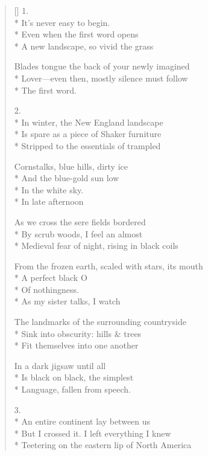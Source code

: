 \label{ch:landscapes}
\settowidth{\versewidth}{The scale, the correspondence between the map's red}
\begin{verse}[\versewidth]
1.\\*
It's never easy to begin.\\*
Even when the first word opens\\*
A new landscape, so vivid the grass

Blades tongue the back of your newly imagined\\*
Lover---even then, mostly silence must follow\\*
The first word.

2.\\*
In winter, the New England landscape\\*
Is spare as a piece of Shaker furniture\\*
Stripped to the essentials of trampled

Cornstalks, blue hills, dirty ice\\*
And the blue-gold sun low\\*
In the white sky.\\*
\hspace{3\vgap} In late afternoon

As we cross the sere fields bordered\\*
By scrub woods, I feel an almost\\*
Medieval fear of night, rising in black coils

From the frozen earth, scaled with stars, its mouth\\*
A perfect black O\\*
Of nothingness.\\*
\hspace{3\vgap} As my sister talks, I watch

The landmarks of the surrounding countryside\\*
Sink into obscurity: hills \& trees\\*
Fit themselves into one another

In a dark jigsaw until all\\*
Is black on black, the simplest\\*
Language, fallen from speech.

3.\\*
An entire continent lay between us\\*
But I crossed it. I left everything I knew\\*
Teetering on the eastern lip of North America


\end{verse}
